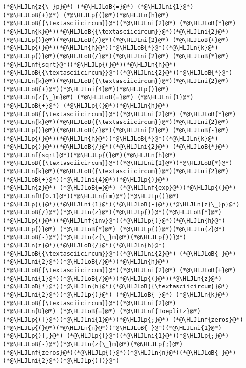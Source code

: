 \documentclass[12pt,landscape]{article}
\newcommand{\HLJLn}[1]{#1}
\newcommand{\HLJLnf}[1]{\textcolor[RGB]{66,102,213}{#1}}
\newcommand{\HLJLnfB}[1]{\textcolor[RGB]{59,151,46}{#1}}
\newcommand{\HLJLni}[1]{\textcolor[RGB]{59,151,46}{#1}}
\newcommand{\HLJLoB}[1]{\textcolor[RGB]{102,102,102}{\textbf{#1}}}
\newcommand{\HLJLp}[1]{#1}
\begin{document}
{\begin{lstlisting}
(*@\HLJLn{z{\_}p}@*) (*@\HLJLoB{=}@*) (*@\HLJLni{1}@*) (*@\HLJLoB{+}@*) (*@\HLJLp{(}@*)(*@\HLJLn{h}@*)(*@\HLJLoB{{\textasciicircum}}@*)(*@\HLJLni{2}@*) (*@\HLJLoB{*}@*) (*@\HLJLn{k}@*)(*@\HLJLoB{{\textasciicircum}}@*)(*@\HLJLni{2}@*)(*@\HLJLp{)}@*)(*@\HLJLoB{/}@*)(*@\HLJLni{2}@*) (*@\HLJLoB{+}@*) (*@\HLJLp{(}@*)(*@\HLJLn{h}@*)(*@\HLJLoB{*}@*)(*@\HLJLn{k}@*)(*@\HLJLp{)}@*)(*@\HLJLoB{/}@*)(*@\HLJLni{2}@*) (*@\HLJLoB{*}@*) (*@\HLJLnf{sqrt}@*)(*@\HLJLp{(}@*)(*@\HLJLn{h}@*)(*@\HLJLoB{{\textasciicircum}}@*)(*@\HLJLni{2}@*)(*@\HLJLoB{*}@*)(*@\HLJLn{k}@*)(*@\HLJLoB{{\textasciicircum}}@*)(*@\HLJLni{2}@*)(*@\HLJLoB{+}@*)(*@\HLJLni{4}@*)(*@\HLJLp{)}@*)
(*@\HLJLn{z{\_}m}@*) (*@\HLJLoB{=}@*) (*@\HLJLni{1}@*) (*@\HLJLoB{+}@*) (*@\HLJLp{(}@*)(*@\HLJLn{h}@*)(*@\HLJLoB{{\textasciicircum}}@*)(*@\HLJLni{2}@*) (*@\HLJLoB{*}@*) (*@\HLJLn{k}@*)(*@\HLJLoB{{\textasciicircum}}@*)(*@\HLJLni{2}@*)(*@\HLJLp{)}@*)(*@\HLJLoB{/}@*)(*@\HLJLni{2}@*) (*@\HLJLoB{-}@*) (*@\HLJLp{(}@*)(*@\HLJLn{h}@*)(*@\HLJLoB{*}@*)(*@\HLJLn{k}@*)(*@\HLJLp{)}@*)(*@\HLJLoB{/}@*)(*@\HLJLni{2}@*) (*@\HLJLoB{*}@*) (*@\HLJLnf{sqrt}@*)(*@\HLJLp{(}@*)(*@\HLJLn{h}@*)(*@\HLJLoB{{\textasciicircum}}@*)(*@\HLJLni{2}@*)(*@\HLJLoB{*}@*)(*@\HLJLn{k}@*)(*@\HLJLoB{{\textasciicircum}}@*)(*@\HLJLni{2}@*)(*@\HLJLoB{+}@*)(*@\HLJLni{4}@*)(*@\HLJLp{)}@*)
(*@\HLJLn{z}@*) (*@\HLJLoB{=}@*) (*@\HLJLnf{exp}@*)(*@\HLJLp{(}@*)(*@\HLJLnfB{0.1}@*)(*@\HLJLn{im}@*)(*@\HLJLp{)}@*)
(*@\HLJLp{(}@*)(*@\HLJLni{1}@*)(*@\HLJLoB{-}@*)(*@\HLJLn{z{\_}p}@*)(*@\HLJLoB{/}@*)(*@\HLJLn{z}@*)(*@\HLJLp{)}@*)(*@\HLJLoB{*}@*)(*@\HLJLp{(}@*)(*@\HLJLnf{inv}@*)(*@\HLJLp{(}@*)(*@\HLJLn{h}@*)(*@\HLJLp{)}@*) (*@\HLJLoB{*}@*) (*@\HLJLp{(}@*)(*@\HLJLn{z}@*)(*@\HLJLoB{-}@*)(*@\HLJLn{z{\_}m}@*)(*@\HLJLp{))}@*)
(*@\HLJLn{z}@*)(*@\HLJLoB{/}@*)(*@\HLJLn{h}@*)(*@\HLJLoB{{\textasciicircum}}@*)(*@\HLJLni{2}@*) (*@\HLJLoB{-}@*) (*@\HLJLni{2}@*)(*@\HLJLoB{/}@*)(*@\HLJLn{h}@*)(*@\HLJLoB{{\textasciicircum}}@*)(*@\HLJLni{2}@*) (*@\HLJLoB{+}@*) (*@\HLJLni{1}@*)(*@\HLJLoB{/}@*)(*@\HLJLp{(}@*)(*@\HLJLn{z}@*)(*@\HLJLoB{*}@*)(*@\HLJLn{h}@*)(*@\HLJLoB{{\textasciicircum}}@*)(*@\HLJLni{2}@*)(*@\HLJLp{)}@*) (*@\HLJLoB{-}@*) (*@\HLJLn{k}@*)(*@\HLJLoB{{\textasciicircum}}@*)(*@\HLJLni{2}@*)
(*@\HLJLn{U}@*) (*@\HLJLoB{=}@*) (*@\HLJLnf{Toeplitz}@*)(*@\HLJLp{([}@*)(*@\HLJLni{1}@*)(*@\HLJLp{;}@*) (*@\HLJLnf{zeros}@*)(*@\HLJLp{(}@*)(*@\HLJLn{n}@*)(*@\HLJLoB{-}@*)(*@\HLJLni{1}@*)(*@\HLJLp{)],}@*) (*@\HLJLp{[}@*)(*@\HLJLni{1}@*)(*@\HLJLp{;}@*) (*@\HLJLoB{-}@*)(*@\HLJLn{z{\_}m}@*)(*@\HLJLp{;}@*) (*@\HLJLnf{zeros}@*)(*@\HLJLp{(}@*)(*@\HLJLn{n}@*)(*@\HLJLoB{-}@*)(*@\HLJLni{2}@*)(*@\HLJLp{)])}@*)

\end{lstlisting}}
\end{document}
